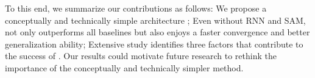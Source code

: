 
To this end, we summarize our contributions as follows: 
 We propose a conceptually and technically simple architecture \oure;
 Even without RNN and SAM, \our not only outperforms all baselines but also enjoys a faster convergence and better generalization ability;
 Extensive study identifies three  factors that contribute to the success of \oure. 
 Our results could motivate future research to rethink the importance of the conceptually and technically simpler method.


